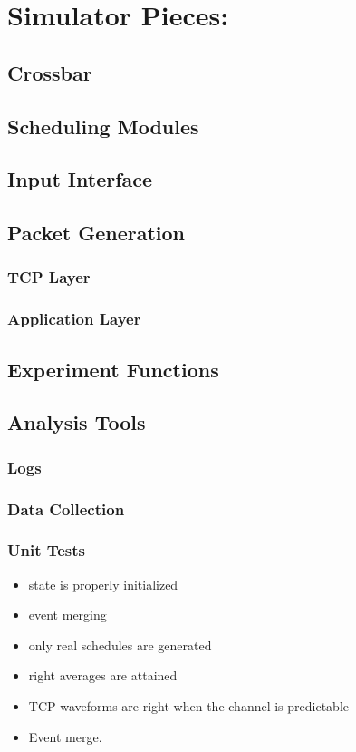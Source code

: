 \documentclass{IEEEtran}%
\begin{document}
\section{Simulator Pieces:}
\subsection{Crossbar}
\subsection{Scheduling Modules}
\subsection{Input Interface}
\subsection{Packet Generation}
\subsubsection{TCP Layer}
\subsubsection{Application Layer}
\subsection{Experiment Functions}
\subsection{Analysis Tools}
\subsubsection{Logs}
\subsubsection{Data Collection}
\subsubsection{Unit Tests}
\begin{itemize}
\item state is properly initialized
\item event merging
\item only real schedules are generated
\item right averages are attained
\item TCP waveforms are right when the channel is predictable
\item Event merge.
\end{itemize}
\end{document}
